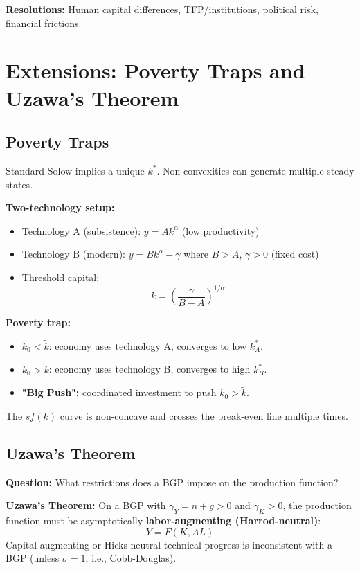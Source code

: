 \documentclass[a4paper,11pt]{article}
\newcommand{\ktilde}{\tilde{k}}
\begin{document}
\textbf{Resolutions:} Human capital differences, TFP/institutions, political risk, financial frictions.

\section{Extensions: Poverty Traps and Uzawa's Theorem}

\subsection*{Poverty Traps}

Standard Solow implies a unique $k^*$. Non-convexities can generate multiple steady states.

\textbf{Two-technology setup:}
\begin{itemize}
    \item Technology A (subsistence): $y = A k^\alpha$ (low productivity)
    \item Technology B (modern): $y = B k^\alpha - \gamma$ where $B > A$, $\gamma > 0$ (fixed cost)
    \item Threshold capital:
    \[
    \ktilde = \left(\frac{\gamma}{B-A}\right)^{1/\alpha}
    \]
\end{itemize}

\begin{resultbox}
\textbf{Poverty trap:}
\begin{itemize}
    \item $k_0 < \ktilde$: economy uses technology A, converges to low $k^*_A$.
    \item $k_0 > \ktilde$: economy uses technology B, converges to high $k^*_B$.
    \item \textbf{"Big Push":} coordinated investment to push $k_0 > \ktilde$.
\end{itemize}
The $sf(k)$ curve is non-concave and crosses the break-even line multiple times.
\end{resultbox}

\subsection*{Uzawa's Theorem}

\textbf{Question:} What restrictions does a BGP impose on the production function?

\begin{resultbox}
\textbf{Uzawa's Theorem:} On a BGP with $\gamma_Y = n+g > 0$ and $\gamma_K > 0$, the production function must be asymptotically \textbf{labor-augmenting (Harrod-neutral)}:
\[
Y = F(K, AL)
\]
Capital-augmenting or Hicks-neutral technical progress is inconsistent with a BGP (unless $\sigma = 1$, i.e., Cobb-Douglas).
\end{resultbox}
\end{document}
